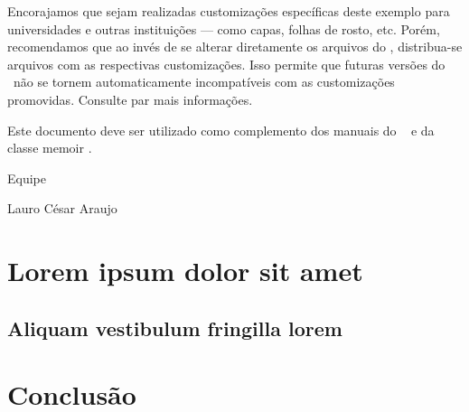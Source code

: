 \documentclass[
12pt,				%
oneside,			%
a4paper,			%
english,			%
french,				%
spanish,			%
brazil,				%
]{abntex2}
\begin{document}
Encorajamos que sejam realizadas customizações específicas deste exemplo para
universidades e outras instituições --- como capas, folhas de rosto, etc.
Porém, recomendamos que ao invés de se alterar diretamente os arquivos do
\abnTeX, distribua-se arquivos com as respectivas customizações.
Isso permite que futuras versões do \abnTeX~não se tornem automaticamente
incompatíveis com as customizações promovidas. Consulte
 par mais informações.

Este documento deve ser utilizado como complemento dos manuais do \abnTeX\ 
\cite{abntex2classe,abntex2cite,abntex2cite-alf} e da classe \textsf{memoir}
\cite{memoir}. 

Equipe \abnTeX 

Lauro César Araujo


\chapter{Lorem ipsum dolor sit amet}

\section{Aliquam vestibulum fringilla lorem}

\lipsum[1]  %

\lipsum[2-3]



\chapter*[Conclusão]{Conclusão}

\lipsum[31-33]


\postextual



%
%
\end{document}
